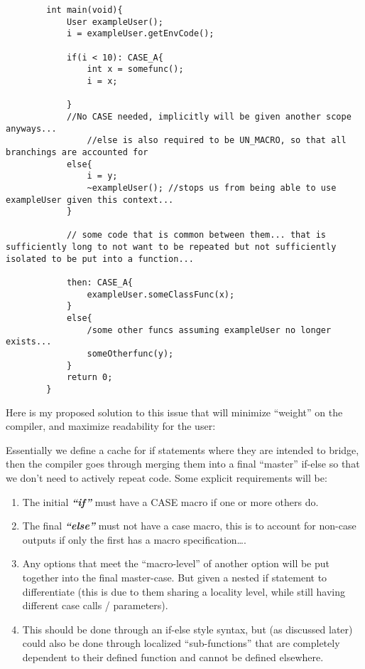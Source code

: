 \documentclass{article}
\newcommand{\textbfit}[1]{\textbf{\textit{#1}}}
\newcommand{\clfootnote}[3]{\color{#2}{\footnote{\label{#1}{ \color{#2}{#3}}}}\color{defaultcolor}}
\begin{document}
    \begin{lstlisting}
        int main(void){
            User exampleUser();
            i = exampleUser.getEnvCode();
    
            if(i < 10): CASE_A{
                int x = somefunc();
                i = x;
    
            }
            //No CASE needed, implicitly will be given another scope anyways...
                //else is also required to be UN_MACRO, so that all branchings are accounted for
            else{
                i = y;
                ~exampleUser(); //stops us from being able to use exampleUser given this context...
            }
    
            // some code that is common between them... that is sufficiently long to not want to be repeated but not sufficiently isolated to be put into a function...
    
            then: CASE_A{
                exampleUser.someClassFunc(x);
            }
            else{
                /some other funcs assuming exampleUser no longer exists...
                someOtherfunc(y);
            }
            return 0;
        }
    \end{lstlisting}
    
        Here is my proposed solution to this issue that will minimize ``weight'' on the compiler, and maximize readability for the user:

    \bigskip
        Essentially we define a cache for if statements where they are intended to bridge, then the compiler goes through merging them into a final ``master'' if-else so that we don't need to actively repeat code. Some explicit requirements will be:

    \begin{enumerate}
        \item The initial \textbfit{``if''} must have a CASE macro if one or more others do\clfootnote{InitalProblemNote}{blue}{in the instance there is only one macro it would be recommended to make said initial if, with all subsequent being non-macro types}.

        \item The final \textbfit{``else''} must not have a case macro, this is to account for non-case outputs if only the first has a macro specification\dots.

        \item Any options that meet the ``macro-level'' of another option will be put together into the final master-case. But given a nested if statement to differentiate (this is due to them sharing a locality level, while still having different case calls / parameters).
        
        \item This should be done through an if-else style syntax, but (as discussed later) could also be done through localized ``sub-functions'' that are completely dependent to their defined function and cannot be defined elsewhere.
    \end{enumerate}
\end{document}
